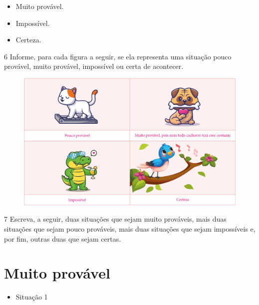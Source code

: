 \pagebreak
\begin{itemize}
\item Muito provável.

\item Impossível.


\item Certeza.

\end{itemize}

\pagebreak
\num{6} Informe, para cada figura a seguir, se ela representa uma situação pouco
provável, muito provável, impossível ou certa de acontecer.

\begin{figure}[htpb!]
\includegraphics[width=\textwidth]{./media/image88.png}
\end{figure}

\num{7} Escreva, a seguir, duas situações que sejam muito prováveis, mais duas
situações que sejam pouco prováveis, mais duas situações que sejam
impossíveis e, por fim, outras duas que sejam certas.


\section*{Muito provável}

\begin{itemize}
\item Situação 1
\end{itemize}

